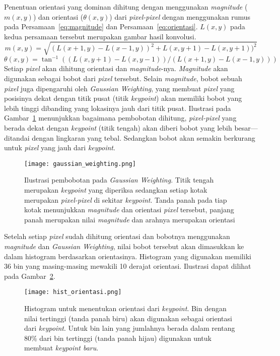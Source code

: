 Penentuan orientasi yang dominan dihitung dengan menggunakan \textit{magnitude} ($m(x,y)$) dan orientasi ($\theta(x,y)$) dari \textit{pixel-pixel} dengan menggunakan rumus pada Persamaan~\ref{eq:magnitude} dan Persamaan~\ref{eq:orientasi}. $L(x,y)$ pada kedua persamaan tersebut merupakan gambar hasil konvolusi.
\begin{equation}
	\label{eq:magnitude}
	m(x,y)=\sqrt{(L(x+1,y)-L(x-1,y))^{2}+L(x,y+1)-L(x,y+1))^{2}}
\end{equation}
\begin{equation}
	\label{eq:orientasi}
	\theta(x,y)=\tan^{-1}((L(x,y+1)-L(x,y-1))/(L(x+1,y)-L(x-1,y)))
\end{equation}
Setiap \textit{pixel} akan dihitung orientasi dan \textit{magnitude}-nya. \textit{Magnitude} akan digunakan sebagai bobot dari \textit{pixel} tersebut. Selain \textit{magnitude}, bobot sebuah \textit{pixel} juga dipengaruhi oleh \textit{Gaussian Weighting}, yang membuat \textit{pixel} yang posisinya dekat dengan titik pusat (titik \textit{keypoint}) akan memiliki bobot yang lebih tinggi dibanding yang lokasinya jauh dari titik pusat. Ilustrasi pada Gambar~\ref{fig:gaussian_weighting} menunjukkan bagaimana pembobotan dihitung, \textit{pixel-pixel} yang berada dekat dengan \textit{keypoint} (titik tengah) akan diberi bobot yang lebih besar---ditandai dengan lingkaran yang tebal. Sedangkan bobot akan semakin berkurang untuk \textit{pixel} yang jauh dari \textit{keypoint}.

\begin{figure}[H]
	\centering
	\texttt{[image: gaussian\_weighting.png]}
	\caption{Ilustrasi pembobotan pada \textit{Gaussian Weighting}. Titik tengah merupakan \textit{keypoint} yang diperiksa sedangkan setiap kotak merupakan \textit{pixel-pixel} di sekitar \textit{keypoint}. Tanda panah pada tiap kotak menunjukkan \textit{magnitude} dan orientasi \textit{pixel} tersebut, panjang panah merupakan nilai \textit{magnitude} dan arahnya merupakan orientasi}
	\label{fig:gaussian_weighting}
\end{figure} 


Setelah setiap \textit{pixel} sudah dihitung orientasi dan bobotnya menggunakan \textit{magnitude} dan \textit{Gaussian Weighting}, nilai bobot tersebut akan dimasukkan ke dalam histogram berdasarkan orientasinya. Histogram yang digunakan memiliki 36 bin yang masing-masing mewakili 10 derajat orientasi. Ilustrasi dapat dilihat pada Gambar~\ref{fig:hist_orientasi}.

\begin{figure}[H]
	\centering
	\texttt{[image: hist\_orientasi.png]}
	\caption{Histogram untuk menentukan orientasi dari \textit{keypoint}. Bin dengan nilai tertinggi (tanda panah biru) akan digunakan sebagai orientasi dari \textit{keypoint}. Untuk bin lain yang jumlahnya berada dalam rentang $80\%$ dari bin tertinggi (tanda panah hijau) digunakan untuk membuat \textit{keypoint baru}.}
	\label{fig:hist_orientasi}
\end{figure}

